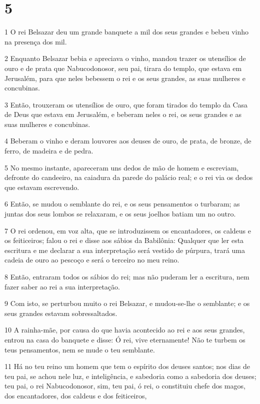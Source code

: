\chapter{5}

\par 1 O rei Belsazar deu um grande banquete a mil dos seus grandes e bebeu vinho na presença dos mil.
\par 2 Enquanto Belsazar bebia e apreciava o vinho, mandou trazer os utensílios de ouro e de prata que Nabucodonosor, seu pai, tirara do templo, que estava em Jerusalém, para que neles bebessem o rei e os seus grandes, as suas mulheres e concubinas.
\par 3 Então, trouxeram os utensílios de ouro, que foram tirados do templo da Casa de Deus que estava em Jerusalém, e beberam neles o rei, os seus grandes e as suas mulheres e concubinas.
\par 4 Beberam o vinho e deram louvores aos deuses de ouro, de prata, de bronze, de ferro, de madeira e de pedra.
\par 5 No mesmo instante, apareceram uns dedos de mão de homem e escreviam, defronte do candeeiro, na caiadura da parede do palácio real; e o rei via os dedos que estavam escrevendo.
\par 6 Então, se mudou o semblante do rei, e os seus pensamentos o turbaram; as juntas dos seus lombos se relaxaram, e os seus joelhos batiam um no outro.
\par 7 O rei ordenou, em voz alta, que se introduzissem os encantadores, os caldeus e os feiticeiros; falou o rei e disse aos sábios da Babilônia: Qualquer que ler esta escritura e me declarar a sua interpretação será vestido de púrpura, trará uma cadeia de ouro ao pescoço e será o terceiro no meu reino.
\par 8 Então, entraram todos os sábios do rei; mas não puderam ler a escritura, nem fazer saber ao rei a sua interpretação.
\par 9 Com isto, se perturbou muito o rei Belsazar, e mudou-se-lhe o semblante; e os seus grandes estavam sobressaltados.
\par 10 A rainha-mãe, por causa do que havia acontecido ao rei e aos seus grandes, entrou na casa do banquete e disse: Ó rei, vive eternamente! Não te turbem os teus pensamentos, nem se mude o teu semblante.
\par 11 Há no teu reino um homem que tem o espírito dos deuses santos; nos dias de teu pai, se achou nele luz, e inteligência, e sabedoria como a sabedoria dos deuses; teu pai, o rei Nabucodonosor, sim, teu pai, ó rei, o constituiu chefe dos magos, dos encantadores, dos caldeus e dos feiticeiros,
